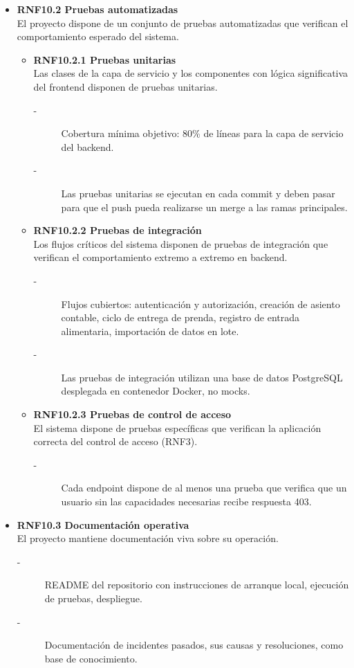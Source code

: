 \begin{itemize}
    \item \textbf{RNF10.2 Pruebas automatizadas} \\
    El proyecto dispone de un conjunto de pruebas automatizadas que
    verifican el comportamiento esperado del sistema.
    \begin{itemize}
        \item \textbf{RNF10.2.1 Pruebas unitarias} \\
        Las clases de la capa de servicio y los componentes con lógica
        significativa del frontend disponen de pruebas unitarias.
        \begin{description}
            \item[-] Cobertura mínima objetivo: 80\% de líneas para la capa de servicio del backend.
            \item[-] Las pruebas unitarias se ejecutan en cada commit y deben pasar
            para que el push pueda realizarse un merge a las ramas principales. 
        \end{description}
        \item \textbf{RNF10.2.2 Pruebas de integración} \\
        Los flujos críticos del sistema disponen de pruebas de integración
        que verifican el comportamiento extremo a extremo en backend.
        \begin{description}
            \item[-] Flujos cubiertos: autenticación y autorización, creación de
            asiento contable, ciclo de entrega de prenda, registro de entrada
            alimentaria, importación de datos en lote. 
            \item[-] Las pruebas de integración utilizan una base de datos PostgreSQL
            desplegada en contenedor Docker, no mocks.
        \end{description}
        \item \textbf{RNF10.2.3 Pruebas de control de acceso} \\
        El sistema dispone de pruebas específicas que verifican la
        aplicación correcta del control de acceso (RNF3).
        \begin{description}
            \item[-] Cada endpoint dispone de al menos una prueba que verifica que
            un usuario sin las capacidades necesarias recibe respuesta 403. 
        \end{description}
    \end{itemize}


    \item \textbf{RNF10.3 Documentación operativa} \\
    El proyecto mantiene documentación viva sobre su operación.
    \begin{description}
        \item[-] README del repositorio con instrucciones de arranque local,
        ejecución de pruebas, despliegue. 
        \item[-] Documentación de incidentes pasados, sus causas y resoluciones,
        como base de conocimiento.
    \end{description}
\end{itemize}



